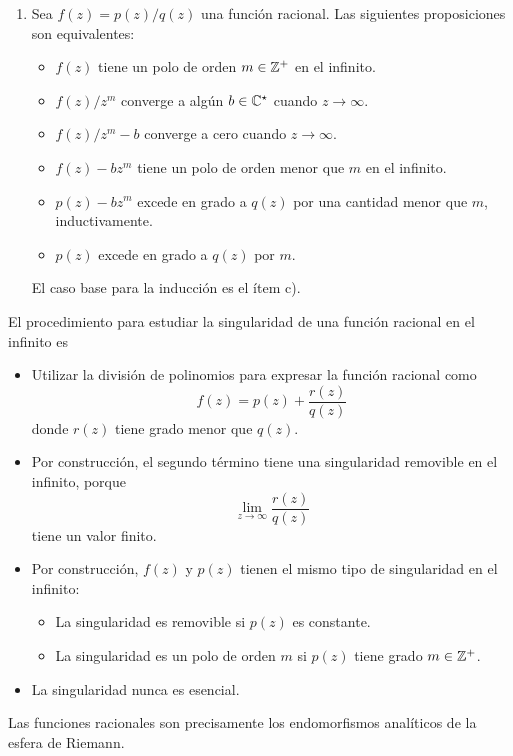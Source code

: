 \begin{solution}
\begin{enumerate}[label=(\alph*)]
    \item Sea $f(z) = p(z) / q(z)$ una función racional. Las siguientes proposiciones son equivalentes:
    \begin{itemize}
        \item $f(z)$ tiene un polo de orden $m \in \mathbb Z^+$ en el infinito.
        \item $f(z) / z^m$ converge a algún $b \in \mathbb C^\star$ cuando $z \to \infty$.
        \item $f(z) / z^m - b$ converge a cero cuando $z \to \infty$.
        \item $f(z) - bz^m$ tiene un polo de orden menor que $m$ en el infinito.
        \item $p(z) - bz^m$ excede en grado a $q(z)$ por una cantidad menor que $m$, inductivamente.
        \item $p(z)$ excede en grado a $q(z)$ por $m$.
    \end{itemize}
    
    El caso base para la inducción es el ítem c).
\end{enumerate}
El procedimiento para estudiar la singularidad de una función racional en el infinito es
\begin{itemize}
    \item Utilizar la división de polinomios para expresar la función racional como
    $$f(z) = p(z) + \frac {r(z)} {q(z)}$$
    donde $r(z)$ tiene grado menor que $q(z)$.
    
    \item Por construcción, el segundo término tiene una singularidad removible en el infinito, porque
    $$\lim_{z \to \infty} \frac {r(z)} {q(z)}$$
    tiene un valor finito.
    
    \item Por construcción, $f(z)$ y $p(z)$ tienen el mismo tipo de singularidad en el infinito:
    \begin{itemize}
        \item La singularidad es removible si $p(z)$ es constante.
        \item La singularidad es un polo de orden $m$ si $p(z)$ tiene grado $m \in \mathbb Z^+$.
    \end{itemize}
    
    \item La singularidad nunca es esencial.
\end{itemize}
Las funciones racionales son precisamente los endomorfismos analíticos de la esfera de Riemann.
\end{solution}
